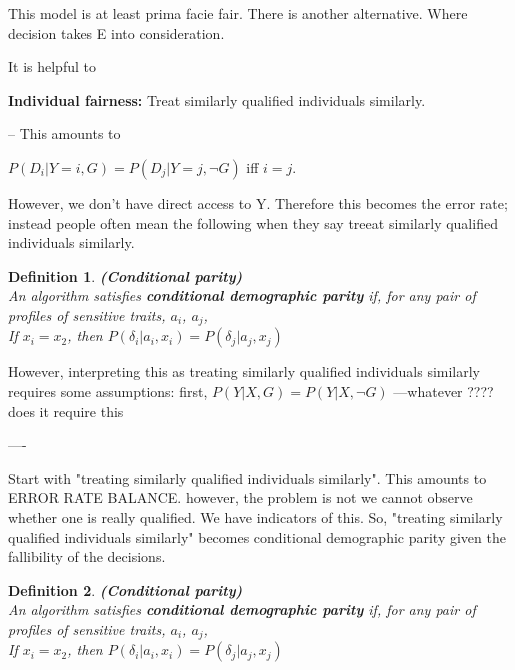 \documentclass{article}
\newtheorem{definition}{Definition}
\begin{document}
This model is at least prima facie fair. There is another alternative. Where decision takes E into consideration. 


It is helpful to 
    

\textbf{Individual fairness:} Treat similarly qualified individuals similarly. 

-- This amounts to 

$P(D_i|Y=i, G) = P(D_j|Y=j, \neg G)$ iff $i=j$. 

However, we don't have direct access to Y. Therefore this becomes the error rate; instead people often mean the following when they say treeat similarly qualified individuals similarly. 

\begin{definition}
\textup{\textbf{ (Conditional parity) } \\
\indent
An algorithm satisfies \textbf{conditional demographic parity} if, for any pair of profiles of sensitive traits}, $a_i$,  $a_j$, \\

\textup{If } $x_i = x_2$\textup{, then } $P(\delta_i|a_i, x_i) = P(\delta_j|a_j, x_j)$
\end{definition}

However, interpreting this as treating similarly qualified individuals similarly requires some assumptions: first, $P(Y|X, G) = P(Y|X, \neg G)$ ---whatever ????  does it require this

----








Start with "treating similarly qualified individuals similarly". This amounts to ERROR RATE BALANCE. however, the problem is not we cannot observe whether one is really qualified. We have indicators of this. So, "treating similarly qualified individuals similarly" becomes conditional demographic parity given the fallibility of the decisions. 


\begin{definition}
\textup{\textbf{ (Conditional parity) } \\
\indent
An algorithm satisfies \textbf{conditional demographic parity} if, for any pair of profiles of sensitive traits}, $a_i$,  $a_j$, \\

\textup{If } $x_i = x_2$\textup{, then } $P(\delta_i|a_i, x_i) = P(\delta_j|a_j, x_j)$
\end{definition}
\end{document}
